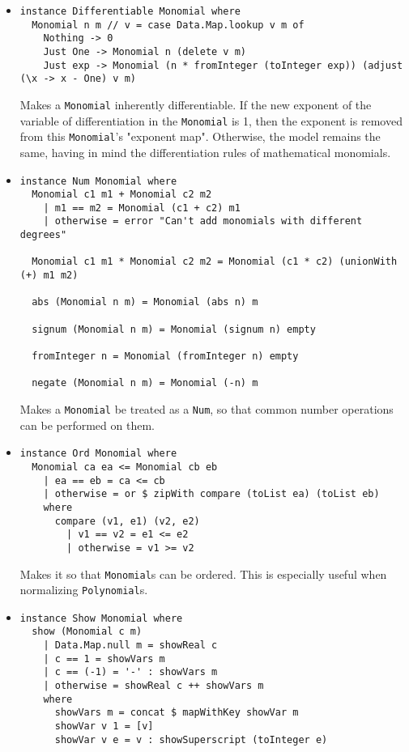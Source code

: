 \documentclass[11pt,a4paper]{article}
\begin{document}
\begin{itemize}
    \item \begin{lstlisting}
instance Differentiable Monomial where
  Monomial n m // v = case Data.Map.lookup v m of
    Nothing -> 0
    Just One -> Monomial n (delete v m)
    Just exp -> Monomial (n * fromInteger (toInteger exp)) (adjust (\x -> x - One) v m)
    \end{lstlisting}

          Makes a \lstinline{Monomial} inherently differentiable. If the new exponent of the variable of differentiation in the \lstinline{Monomial} is 1, then the exponent is removed from this \lstinline{Monomial}'s "exponent map". Otherwise, the model remains the same, having in mind the differentiation rules of mathematical monomials.

    \item \begin{lstlisting}
instance Num Monomial where
  Monomial c1 m1 + Monomial c2 m2
    | m1 == m2 = Monomial (c1 + c2) m1
    | otherwise = error "Can't add monomials with different degrees"

  Monomial c1 m1 * Monomial c2 m2 = Monomial (c1 * c2) (unionWith (+) m1 m2)

  abs (Monomial n m) = Monomial (abs n) m

  signum (Monomial n m) = Monomial (signum n) empty

  fromInteger n = Monomial (fromInteger n) empty

  negate (Monomial n m) = Monomial (-n) m
    \end{lstlisting}

          Makes a \lstinline{Monomial} be treated as a \lstinline{Num}, so that common number operations can be performed on them.

    \item \begin{lstlisting}
instance Ord Monomial where
  Monomial ca ea <= Monomial cb eb
    | ea == eb = ca <= cb
    | otherwise = or $ zipWith compare (toList ea) (toList eb)
    where
      compare (v1, e1) (v2, e2)
        | v1 == v2 = e1 <= e2
        | otherwise = v1 >= v2
    \end{lstlisting}

          Makes it so that \lstinline{Monomial}s can be ordered. This is especially useful when normalizing \lstinline{Polynomial}s.

    \item \begin{lstlisting}
instance Show Monomial where
  show (Monomial c m)
    | Data.Map.null m = showReal c
    | c == 1 = showVars m
    | c == (-1) = '-' : showVars m
    | otherwise = showReal c ++ showVars m
    where
      showVars m = concat $ mapWithKey showVar m
      showVar v 1 = [v]
      showVar v e = v : showSuperscript (toInteger e)
    \end{lstlisting}


\end{itemize}
\end{document}
